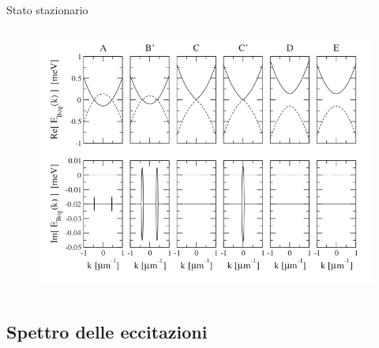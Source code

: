 \documentclass[10pt]{beamer}
\begin{document}
\begin{frame}{Stato stazionario}
\begin{columns}[t]
 \begin{column}{.5\textwidth}
  \begin{figure}
   \includegraphics[width=\columnwidth]{files/Spectra.png}
  \end{figure}
 \end{column}

\end{columns}


\end{frame}

\subsection{Spettro delle eccitazioni}
\end{document}
